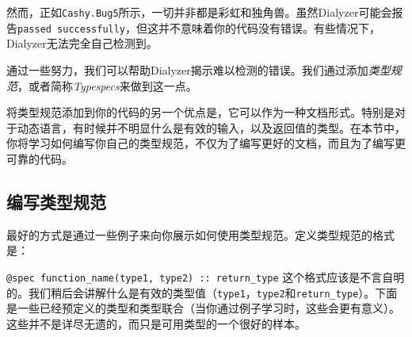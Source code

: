 然而，正如\texttt{Cashy.Bug5}所示，一切并非都是彩虹和独角兽。虽然Dialyzer可能会报告\texttt{passed successfully}，但这并不意味着你的代码没有错误。有些情况下，Dialyzer无法完全自己检测到。

通过一些努力，我们可以帮助Dialyzer揭示难以检测的错误。我们通过添加\emph{类型规范}，或者简称\emph{Typespecs}来做到这一点。

将类型规范添加到你的代码的另一个优点是，它可以作为一种文档形式。特别是对于动态语言，有时候并不明显什么是有效的输入，以及返回值的类型。在本节中，你将学习如何编写你自己的类型规范，不仅为了编写更好的文档，而且为了编写更可靠的代码。

\subsection{编写类型规范}

最好的方式是通过一些例子来向你展示如何使用类型规范。定义类型规范的格式是：

\texttt{@spec function\_name(type1, type2) :: return\_type}
这个格式应该是不言自明的。我们稍后会讲解什么是有效的类型值（\texttt{type1}，\texttt{type2}和\texttt{return\_type}）。下面是一些已经预定义的类型和类型联合（当你通过例子学习时，这些会更有意义）。这些并不是详尽无遗的，而只是可用类型的一个很好的样本。

